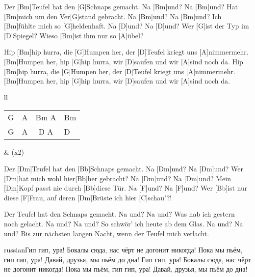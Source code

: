 

\begin{guitar}
	Der [Bm]Teufel hat den [G]Schnaps gemacht. Na [Bm]und? Na [Bm]und?
	Hat [Bm]mich um den Ver[G]stand gebracht. Na [Bm]und? Na [Bm]und?
	Ich [Bm]fühlte mich so [G]heldenhaft. Na [D]und? Na [D]und?
	Wer [G]ist der Typ im [D]Spiegel? Wieso [Bm]ist ihm nur so [A]{ü}bel?

	Hip [Bm]hip hurra, die [G]Humpen her, der [D]Teufel kriegt uns [A]nimmermehr.
	[Bm]Humpen her, hip [G]hip hurra, wir [D]saufen und wir [A]sind noch da.
	Hip [Bm]hip hurra, die [G]Humpen her, der [D]Teufel kriegt uns [A]nimmermehr.
	[Bm]Humpen her, hip [G]hip hurra, wir [D]saufen und wir [A]sind noch da.
	
	{\footnotesize\begin{tabular}{ll}
			\begin{tabular}{l|l|c|l} G & A & Bm A & Bm \\ G & A & D  A & D\end{tabular} & (x2)
	\end{tabular}}

	Der [Dm]Teufel hat den [Bb]Schnaps gemacht. Na [Dm]und? Na [Dm]und?
	Wer [Dm]hat mich wohl hier[Bb]her gebracht? Na [Dm]und? Na [Dm]und?
	Mein [Dm]Kopf passt nie durch [Bb]diese Tür. Na [F]und? Na [F]und?
	Wer [Bb]ist nur diese [F]Frau, auf deren [Dm]Brüste ich hier [C]schau'?!
	
	 
	
	
	Der Teufel hat den Schnaps gemacht. Na und? Na und?
	Was hab ich gestern noch gelacht. Na und? Na und?
	So schwör' ich heute ab dem Glas. Na und? Na und?
	Bis zur nächsten langen Nacht, wenn der Teufel mich verlacht.
	
	\begin{otherlanguage*}{russian}Гип гип, ура! Бокалы сюда, нас чёрт не догонит никогда!
	Пока мы пьём, гип гип, ура! Давай, друзья, мы пьём до дна!
	Гип гип, ура! Бокалы сюда, нас чёрт не догонит никогда!
	Пока мы пьём, гип гип, ура! Давай, друзья, мы пьём до дна!\end{otherlanguage*}
	

\end{guitar}
